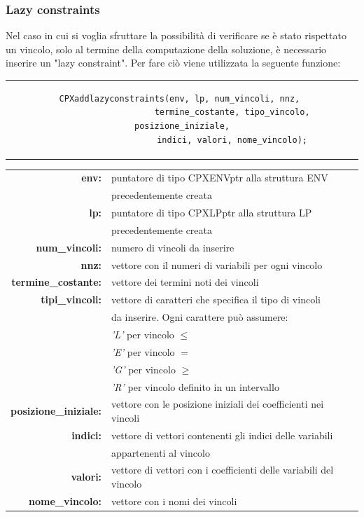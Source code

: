 \subsubsection{Lazy constraints}
Nel caso in cui si voglia sfruttare la possibilità di verificare se è stato rispettato un vincolo, solo al termine della computazione della soluzione, è necessario inserire un "lazy constraint". Per fare ciò viene utilizzata la seguente funzione:
\begin{center}
\begin{tabular}{c}
\begin{lstlisting}[linewidth=380pt, basicstyle=\footnotesize\sffamily,]     
CPXaddlazyconstraints(env, lp, num_vincoli, nnz, 
					termine_costante, tipo_vincolo, posizione_iniziale,
					indici, valori, nome_vincolo);
\end{lstlisting}
\end{tabular}
\end{center}
\begin{table}[h]
\begin{tabular}{rl}
\textbf{env:} & {puntatore di tipo CPXENVptr alla struttura ENV}\\
& {precedentemente creata}\\
\textbf{lp:} & {puntatore di tipo CPXLPptr alla struttura LP}\\
& {precedentemente creata}\\
\textbf{num\_vincoli:} & {numero di vincoli da inserire}\\
\textbf{nnz:} & {vettore con il numeri di variabili per ogni vincolo}\\ 
\textbf{termine\_costante:} & {vettore dei termini noti dei vincoli}\\
\textbf{tipi\_vincoli:} & {vettore di caratteri che specifica il tipo di vincoli}\\
&{da inserire. Ogni carattere può assumere:}\\
&{\textit{'L'} per vincolo $\leq$}\\
&{\textit{'E'} per vincolo $=$}\\
&{\textit{'G'} per vincolo $\geq$}\\
&{\textit{'R'} per vincolo definito in un intervallo}\\
\textbf{posizione\_iniziale:} & {vettore con le posizione iniziali dei coefficienti nei vincoli}\\
\textbf{indici:} & {vettore di vettori contenenti gli indici delle variabili }\\
& {appartenenti al vincolo}\\
\textbf{valori:} & {vettore di vettori con i coefficienti delle variabili del vincolo}\\
\textbf{nome\_vincolo:} & {vettore con i nomi dei vincoli}\\
\end{tabular}
\end{table}
